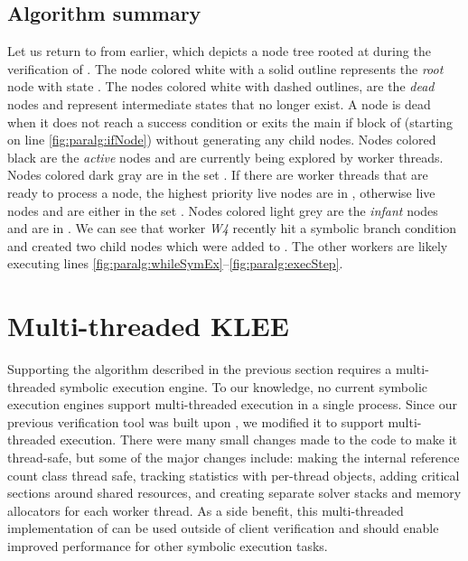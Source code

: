 \subsection{Algorithm summary}
Let us return to  from earlier, which
depicts a node tree rooted at  during the
verification of \msg{\msgNmbr}. The node colored white with a solid
outline represents the \emph{root} node with state
. The nodes colored white with dashed outlines,
are the \emph{dead} nodes and represent intermediate states that no
longer exist. A node is dead when it does not reach a success
condition or exits the main if block of \verifyWorker (starting on line
\ref{fig:paralg:ifNode}) without generating any child nodes.
Nodes colored black are the \emph{active} nodes and
are currently being explored by worker threads. Nodes colored dark
gray are in the set \liveSet. If there are worker threads that are ready
to process a node, the highest priority live nodes are in \readyQ,
otherwise live nodes and are either in the set \liveSet. Nodes colored
light grey are  the \emph{infant} nodes and are in \addedQ. We can see
that worker \emph{W4} recently hit a symbolic branch condition and
created two child nodes which were added to \addedQ. The other workers
are likely executing lines
\ref{fig:paralg:whileSymEx}--\ref{fig:paralg:execStep}. 

\section{Multi-threaded KLEE}
\label{sec:par:klee}

Supporting the algorithm described in the previous section requires a
multi-threaded symbolic execution engine. To our knowledge, no current
symbolic execution engines support multi-threaded execution in a
single process. Since
our previous verification tool was built upon \klee,
we modified it to support multi-threaded execution. There were many
small changes made to the code to make it thread-safe, but some of the
major changes include: making the internal reference count class
thread safe, tracking statistics with per-thread objects, adding
critical sections around shared resources, and 
creating separate solver stacks and memory allocators for each worker
thread. 
As a side benefit, this multi-threaded implementation of \klee
can be used outside of client verification and should
enable improved performance for other symbolic execution tasks.



